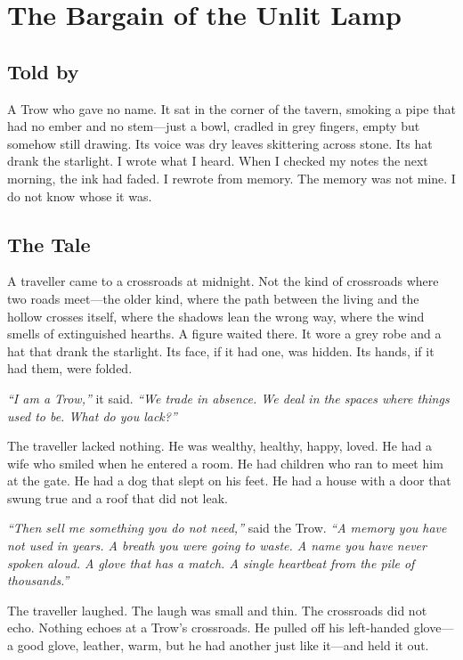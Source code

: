 \chapter{The Bargain of the Unlit Lamp}

\section*{Told by}
A Trow who gave no name. It sat in the corner of the tavern, smoking a pipe that had no ember and no stem—just a bowl, cradled in grey fingers, empty but somehow still drawing. Its voice was dry leaves skittering across stone. Its hat drank the starlight. I wrote what I heard. When I checked my notes the next morning, the ink had faded. I rewrote from memory. The memory was not mine. I do not know whose it was.

\section*{The Tale}

A traveller came to a crossroads at midnight. Not the kind of crossroads where two roads meet—the older kind, where the path between the living and the hollow crosses itself, where the shadows lean the wrong way, where the wind smells of extinguished hearths. A figure waited there. It wore a grey robe and a hat that drank the starlight. Its face, if it had one, was hidden. Its hands, if it had them, were folded.

\textit{``I am a Trow,''} it said. \textit{``We trade in absence. We deal in the spaces where things used to be. What do you lack?''}

The traveller lacked nothing. He was wealthy, healthy, happy, loved. He had a wife who smiled when he entered a room. He had children who ran to meet him at the gate. He had a dog that slept on his feet. He had a house with a door that swung true and a roof that did not leak.

\textit{``Then sell me something you do not need,''} said the Trow. \textit{``A memory you have not used in years. A breath you were going to waste. A name you have never spoken aloud. A glove that has a match. A single heartbeat from the pile of thousands.''}

The traveller laughed. The laugh was small and thin. The crossroads did not echo. Nothing echoes at a Trow's crossroads. He pulled off his left-handed glove—a good glove, leather, warm, but he had another just like it—and held it out.

